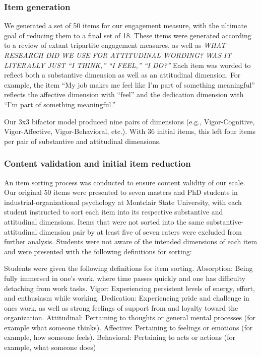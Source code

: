 \documentclass[
  english,
  man]{apa7}
\begin{document}
\hypertarget{item-generation}{%
\subsubsection{Item generation}\label{item-generation}}

We generated a set of 50 items for our engagement measure, with the ultimate goal of reducing them to a final set of 18. These items were generated according to a review of extant tripartite engagement measures, as well as \emph{WHAT RESEARCH DID WE USE FOR ATTITUDINAL WORDING? WAS IT LITERALLY JUST ``I THINK,'' ``I FEEL,'' ``I DO?''} Each item was worded to reflect both a substantive dimension as well as an attitudinal dimension. For example, the item ``My job makes me feel like I'm part of something meaningful'' reflects the affective dimension with ``feel'' and the dedication dimension with ``I'm part of something meaningful.''

Our 3x3 bifactor model produced nine pairs of dimensions (e.g., Vigor-Cognitive, Vigor-Affective, Vigor-Behavioral, etc.). With 36 initial items, this left four items per pair of substantive and attitudinal dimensions.

\hypertarget{content-validation-and-initial-item-reduction}{%
\subsubsection{Content validation and initial item reduction}\label{content-validation-and-initial-item-reduction}}

An item sorting process was conducted to ensure content validity of our scale. Our original 50 items were presented to seven masters and PhD students in industrial-organizational psychology at Montclair State University, with each student instructed to sort each item into its respective substantive and attitudinal dimensions. Items that were not sorted into the same substantive-attitudinal dimension pair by at least five of seven raters were excluded from further analysis. Students were not aware of the intended dimensions of each item and were presented with the following definitions for sorting:

Students were given the following definitions for item sorting. Absorption: Being fully immersed in one's work, where time passes quickly and one has difficulty detaching from work tasks. Vigor: Experiencing persistent levels of energy, effort, and enthusiasm while working. Dedication: Experiencing pride and challenge in ones work, as well as strong feelings of support from and loyalty toward the organization. Attitudinal: Pertaining to thoughts or general mental processes (for example what someone thinks). Affective: Pertaining to feelings or emotions (for example, how someone feels). Behavioral: Pertaining to acts or actions (for example, what someone does)
\end{document}
